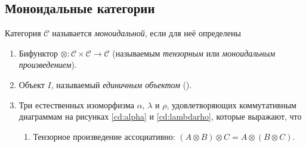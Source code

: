 \subsection{Моноидальные категории}
\begin{definition}
  Категория $\mathcal{C}$ называется \emph{моноидальной}, если для неё определены
  \begin{enumerate}
    \item Бифунктор $\otimes : \mathcal{C} \times \mathcal{C} \to \mathcal{C}$ (называемым \emph{тензорным} или \emph{моноидальным произведением}).
    \item Объект $I$, называемый \emph{единичным объектом} ().
    \item Три естественных изоморфизма $\alpha$, $\lambda$ и $\rho$, удовлетворяющих коммутативным диаграммам на рисунках \ref{cd:alpha} и \ref{cd:lambdarho}, которые выражают, что
      \begin{enumerate}
        \item Тензорное произведение ассоциативно: $(A \otimes B) \otimes C = A \otimes (B \otimes C)$.
\begin{figure}[h]
  \centering

\end{figure}
\end{enumerate}
\end{enumerate}
\end{definition}
